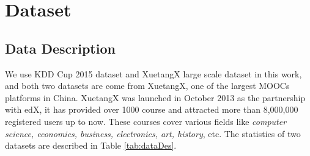 \section{Dataset}
		
		\begin{table}
		\centering
		\caption{The Description of KDDCUP and XuetangX Dataset.}
		\label{tab:dataDes}
	\end{table}
    \subsection{Data Description}
	We use KDD Cup 2015 dataset and XuetangX large scale dataset in this work, and both two datasets are come from XuetangX, one of the largest MOOCs platforms in China. XuetangX was launched in October 2013 as the partnership with edX, it has provided over 1000 course and attracted more than 8,000,000 registered users up to now. These courses cover various fields like \emph{computer science, economics, business, electronics, art, history}, etc. The statistics of two datasets are described in Table \ref{tab:dataDes}.\\
	
